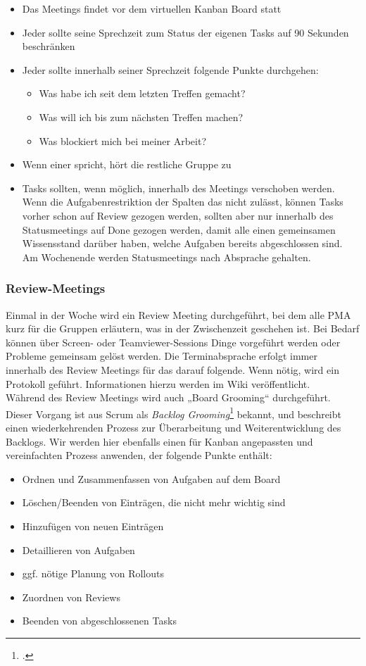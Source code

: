 \begin{itemize}
\item Das Meetings findet vor dem virtuellen Kanban Board statt
\item Jeder sollte seine Sprechzeit zum Status der eigenen Tasks auf 90 Sekunden beschränken
\item Jeder sollte innerhalb seiner Sprechzeit folgende Punkte durchgehen:
\begin{itemize}
\item Was habe ich seit dem letzten Treffen gemacht?
\item Was will ich bis zum nächsten Treffen machen?
\item Was blockiert mich bei meiner Arbeit?
\end{itemize}
\item Wenn einer spricht, hört die restliche Gruppe zu
\item Tasks sollten, wenn möglich, innerhalb des Meetings verschoben werden. Wenn die Aufgabenrestriktion der Spalten das nicht zulässt, können Tasks vorher schon auf Review gezogen werden, sollten aber nur innerhalb des Statusmeetings auf Done gezogen werden, damit alle einen gemeinsamen Wissensstand darüber haben, welche Aufgaben bereits abgeschlossen sind. Am Wochenende werden Statusmeetings nach Absprache gehalten.
\end{itemize}

\subsubsection{Review-Meetings}
Einmal in der Woche wird ein Review Meeting durchgeführt, bei dem alle PMA kurz für die Gruppen erläutern, was in der Zwischenzeit geschehen ist. Bei Bedarf können über Screen- oder Teamviewer-Sessions Dinge vorgeführt werden oder Probleme gemeinsam gelöst werden. Die Terminabsprache erfolgt immer innerhalb des Review Meetings für das darauf folgende. Wenn nötig, wird ein Protokoll geführt. Informationen hierzu werden im Wiki veröffentlicht. \\

Während des Review Meetings wird auch „Board Grooming“ durchgeführt. Dieser Vorgang ist aus Scrum als \textit{Backlog Grooming}\footcite{wikiScrum} bekannt, und beschreibt einen wiederkehrenden Prozess zur Überarbeitung und Weiterentwicklung des Backlogs. Wir werden hier ebenfalls einen für Kanban angepassten und vereinfachten Prozess anwenden, der folgende Punkte enthält:

\begin{itemize}
\item Ordnen und Zusammenfassen von Aufgaben auf dem Board
\item Löschen/Beenden von Einträgen, die nicht mehr wichtig sind
\item Hinzufügen von neuen Einträgen
\item Detaillieren von Aufgaben
\item ggf. nötige Planung von Rollouts
\item Zuordnen von Reviews
\item Beenden von abgeschlossenen Tasks
\end{itemize}

